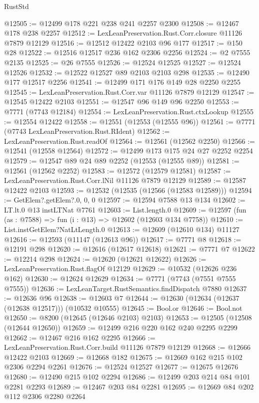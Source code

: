 \begin{lexlean}{RustStd}
\begin{coremodule}
@12505 := @12499 @178 @221 @238 @241 @2257 @2300
@12508 := @12467 @178 @238 @2257
@12512 := LexLeanPreservation.Rust.Corr.closure @11126 @7879 @12129
@12516 := @12512 @12422 @2103 @96 @177
@12517 := @150 @28
@12522 := @12516 @12517 @236 @162 @2306 @2256
@12524 := @2 @7555 @2135
@12525 := @26 @7555
@12526 := @12524 @12525
@12527 := @12524 @12526
@12532 := @12522 @12527 @89 @2103 @2103 @298
@12535 := @12490 @177 @12517 @2256
@12541 := @12499 @171 @176 @149 @28 @2250 @2255
@12545 := LexLeanPreservation.Rust.Corr.var @11126 @7879 @12129
@12547 := @12545 @12422 @2103
@12551 := @12547 @96 @149 @96 @2250
@12553 := @7771 (@7743 @12184)
@12554 := LexLeanPreservation.Rust.ctxLookup
@12555 := @12554 @12422
@12558 := @12551 (@12553 (@12555 @96))
@12561 := @7771 (@7743 LexLeanPreservation.Rust.RIdent)
@12562 := LexLeanPreservation.Rust.readOf
@12564 := @12561 (@12562 @2250)
@12566 := @12541 (@12558 @12564)
@12572 := @12499 @173 @175 @24 @27 @2252 @2254
@12579 := @12547 @89 @24 @89 @2252 (@12553 (@12555 @89))
@12581 := @12561 (@12562 @2252)
@12583 := @12572 (@12579 @12581)
@12587 := LexLeanPreservation.Rust.Corr.lNil @11126 @7879 @12129
@12589 := @12587 @12422 @2103
@12593 := @12532 (@12535 (@12566 (@12583 @12589)))
@12594 := GetElem?.getElem?.{0, 0, 0}
@12597 := @12594 @7588 @13 @134
@12602 := LT.lt.{0} @13 instLTNat @7761
@12603 := List.length.{0}
@12609 := @12597 (fun (as : @7588) => fun (i : @13) => @12602 (@12603 @134 @7758))
@12610 := List.instGetElem?NatLtLength.{0}
@12613 := @12609 (@12610 @134) @11127
@12616 := @12593 (@11147 (@12613 @96))
@12617 := @7771 @8
@12618 := @12191 @298
@12620 := @12616 (@12617 @12618)
@12621 := @7771 @7
@12622 := @12214 @298
@12624 := @12620 (@12621 @12622)
@12626 := LexLeanPreservation.Rust.flagOf @12129
@12629 := @10532 (@12626 @236 @162)
@12630 := @12624 @12629
@12634 := @7771 (@7743 (@7551 @7555 @7555))
@12636 := LexLeanTarget.RustSemantics.findDispatch @7880
@12637 := @12636 @96
@12638 := @12603 @7
@12644 := @12630 (@12634 (@12637 (@12638 @12517))) (@10532 @10555)
@12645 := Bool.or
@12646 := Bool.not
@12650 := @8200 (@12645 (@12646 @2103) @2103)
@12653 := @12505 (@12508 (@12644 @12650))
@12659 := @12499 @216 @220 @162 @240 @2295 @2299
@12662 := @12467 @216 @162 @2295
@12666 := LexLeanPreservation.Rust.Corr.build @11126 @7879 @12129
@12668 := @12666 @12422 @2103
@12669 := @12668 @182
@12675 := @12669 @162 @215 @102 @2306 @2294 @2261
@12676 := @12524 @12527
@12677 := @12675 @12676
@12680 := @12490 @215 @102 @2294
@12686 := @12499 @203 @214 @84 @101 @2281 @2293
@12689 := @12467 @203 @84 @2281
@12695 := @12669 @84 @202 @112 @2306 @2280 @2264

\end{coremodule}
\end{lexlean}

